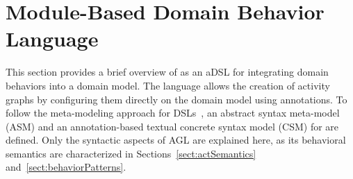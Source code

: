 \section{Module-Based Domain Behavior Language}
\label{sect:agl} 



This section provides a brief overview of \agl as an aDSL for integrating domain behaviors into a domain model. The language allows the creation of activity graphs by configuring them directly on the domain model using annotations. To follow the meta-modeling approach for DSLs~\cite{kleppe_software_2008}, an abstract syntax meta-model (ASM) and an annotation-based textual concrete syntax model (CSM) for \agl are defined. Only the syntactic aspects of AGL are explained here, as its behavioral semantics are characterized in Sections~\ref{sect:actSemantics} and~\ref{sect:behaviorPatterns}.

